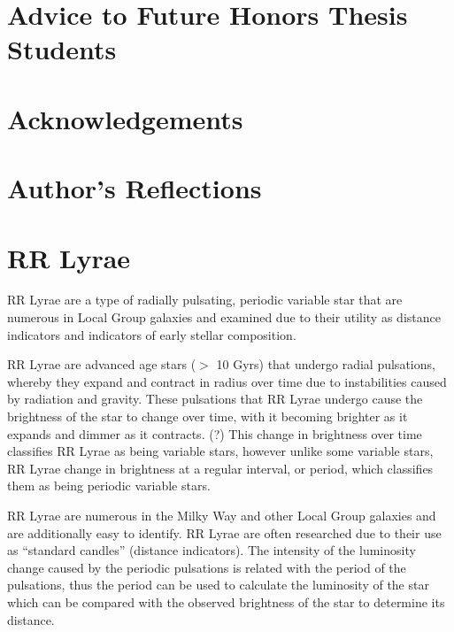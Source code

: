 \documentclass[]{article}
\begin{document}
\newpage

\doublespacing

\tableofcontents

\newpage


\section{Advice to Future Honors Thesis Students}

\newpage

\section{Acknowledgements}

\newpage

\section{Author's Reflections}

\newpage

\section{RR Lyrae}

RR Lyrae are a type of radially pulsating, periodic variable star that are numerous in Local Group galaxies and examined due to their utility as distance indicators and indicators of early stellar composition. \cite{szczygiel_2009, kinemuchi_2006_a}

RR Lyrae are advanced age stars ($>$ 10 Gyrs) that undergo radial pulsations, whereby they expand and contract in radius over time due to instabilities caused by radiation and gravity. \cite{szczygiel_2009, templeton_2010} These pulsations that RR Lyrae undergo cause the brightness of the star to change over time, with it becoming brighter as it expands and dimmer as it contracts. (?) This change in brightness over time classifies RR Lyrae as being variable stars, however unlike some variable stars, RR Lyrae change in brightness at a regular interval, or period, which classifies them as being periodic variable stars. \cite{AAVSO_nodate}

RR Lyrae are numerous in the Milky Way and other Local Group galaxies and are additionally easy to identify. \cite{soszynski_2016, kinemuchi_2006} RR Lyrae are often researched due to their use as ``standard candles'' (distance indicators). \cite{soszynski_2016} The intensity of the luminosity change caused by the periodic pulsations is related with the period of the pulsations, thus the period can be used to calculate the luminosity of the star which can be compared with the observed brightness of the star to determine its distance. \cite{templeton_2010}
\end{document}
